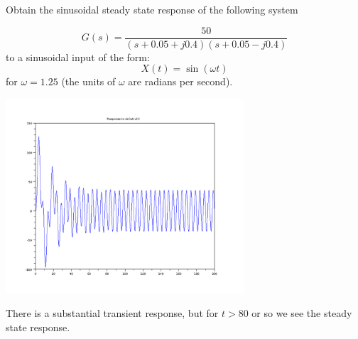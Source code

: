 \begin{ExampleSmall}
Obtain the sinusoidal steady state response of  the following system

\[
G(s) = \frac{50}{(s+0.05+j0.4)(s+0.05-j0.4)}
\]
to a sinusoidal input of the form:
\[
X(t) = \sin(\omega t)
\]
for $\omega = 1.25$ (the units of $\omega$ are radians per second).


\includegraphics[width=3.5in]{figs05/sinusoid_contina.png}

There is a substantial transient response, but for $t>80$ or so we see the steady state response.

\end{ExampleSmall}





